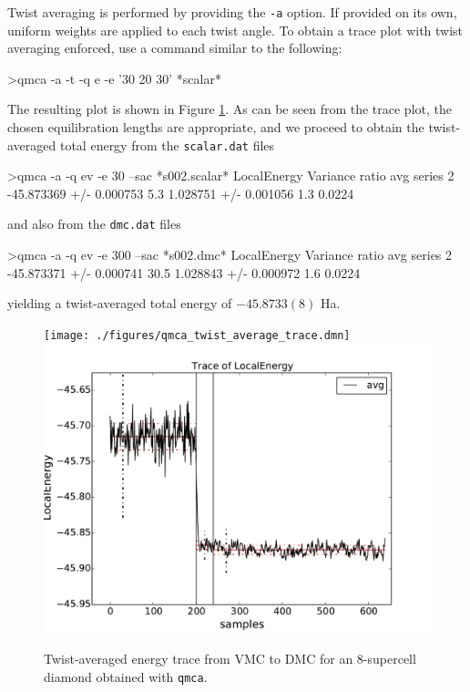 Twist averaging is performed by providing the \texttt{-a} 
option.  If provided on its own, uniform weights are applied 
to each twist angle.  To obtain a trace plot with twist averaging 
enforced, use a command similar to the following:
\begin{shade}
>qmca -a -t -q e -e '30 20 30' *scalar*
\end{shade}
\noindent
The resulting plot is shown in Figure \ref{fig:qmca_twist_average}.
As can be seen from the trace plot, the chosen equilibration lengths 
are appropriate, and we proceed to obtain the twist-averaged total energy
from the \texttt{scalar.dat} files
\begin{shade}
>qmca -a -q ev -e 30 --sac *s002.scalar*
                            LocalEnergy               Variance           ratio 
avg  series 2  -45.873369 +/- 0.000753    5.3   1.028751 +/- 0.001056    1.3   0.0224 
\end{shade}
\noindent
and also from the \texttt{dmc.dat} files
\begin{shade}
>qmca -a -q ev -e 300 --sac *s002.dmc*
                            LocalEnergy               Variance           ratio 
avg  series 2  -45.873371 +/- 0.000741   30.5   1.028843 +/- 0.000972    1.6   0.0224 
\end{shade}
\noindent
yielding a twist-averaged total energy of $-45.8733(8)$ Ha. 

\begin{figure}
\begin{center}
\ifdefined\HCode
\texttt{[image: ./figures/qmca\_twist\_average\_trace.dmn]}
\else
\includegraphics[trim = 0mm 0mm 0mm 0mm, clip,width=0.75\columnwidth]{./figures/qmca_twist_average_trace.pdf}
\fi
\end{center}
\caption{Twist-averaged energy trace from VMC to DMC for an 8-supercell diamond obtained with \texttt{qmca}.}
\label{fig:qmca_twist_average}
\end{figure}

